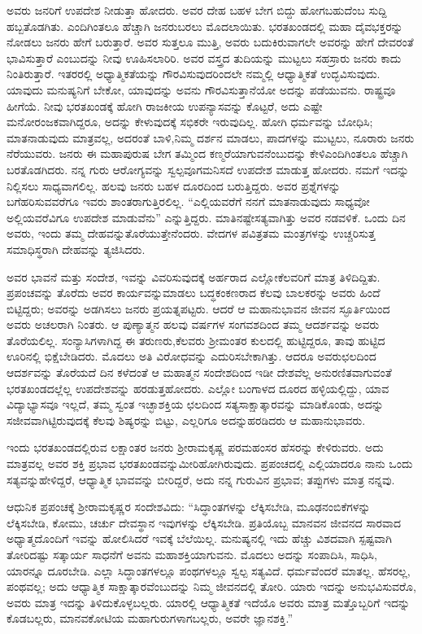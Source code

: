 ಅವರು ಜನರಿಗೆ ಉಪದೇಶ ನೀಡುತ್ತಾ ಹೋದರು. ಅವರ ದೇಹ ಬಹಳ ಬೇಗ ಬಿದ್ದು ಹೋಗಬಹುದೆಂಬ ಸುದ್ದಿ ಹಬ್ಬತೊಡಗಿತು. ಎಂದಿಗಿಂತಲೂ ಹೆಚ್ಚಾಗಿ ಜನರು\break ಬರಲು ಮೊದಲಾಯಿತು. ಭರತಖಂಡದಲ್ಲಿ ಮಹಾ ದೈವಭಕ್ತರನ್ನು ನೋಡಲು ಜನರು ಹೇಗೆ ಬರುತ್ತಾರೆ. ಅವರ ಸುತ್ತಲೂ ಮುತ್ತಿ, ಅವರು ಬದುಕಿರುವಾಗಲೇ ಅವರನ್ನು ಹೇಗೆ ದೇವರಂತೆ ಭಾವಿಸುತ್ತಾರೆ ಎಂಬುದನ್ನು ನೀವು ಊಹಿಸಲಾರಿರಿ. ಅವರ ವಸ್ತ್ರದ ತುದಿಯನ್ನು ಮುಟ್ಟಲು ಸಹಸ್ರಾರು ಜನರು ಕಾದು ನಿಂತಿರುತ್ತಾರೆ. ಇತರರಲ್ಲಿ ಅಧ್ಯಾತ್ಮಿಕತೆಯನ್ನು ಗೌರವಿಸುವುದರಿಂದಲೇ ನಮ್ಮಲ್ಲಿ ಆಧ್ಯಾತ್ಮಿಕತೆ ಉದ್ಭವಿಸುವುದು. ಯಾವುದು ಮನುಷ್ಯನಿಗೆ ಬೇಕೋ, ಯಾವುದನ್ನು ಅವನು ಗೌರವಿಸುತ್ತಾನೆಯೋ ಅದನ್ನು ಪಡೆಯುವನು. ರಾಷ್ಟ್ರವೂ ಹೀಗೆಯೆ. ನೀವು ಭರತಖಂಡಕ್ಕೆ ಹೋಗಿ ರಾಜಕೀಯ ಉಪನ್ಯಾಸವನ್ನು ಕೊಟ್ಟರೆ, ಅದು ಎಷ್ಟೇ ಮನೋರಂಜಕವಾಗಿದ್ದರೂ, ಅದನ್ನು ಕೇಳುವುದಕ್ಕೆ ಸಭಿಕರೇ ಇರುವುದಿಲ್ಲ. ಹೋಗಿ ಧರ್ಮವನ್ನು ಬೋಧಿಸಿ; ಮಾತನಾಡುವುದು ಮಾತ್ರವಲ್ಲ, ಅದರಂತೆ ಬಾಳಿ,\break ನಿಮ್ಮ ದರ್ಶನ ಮಾಡಲು, ಪಾದಗಳನ್ನು ಮುಟ್ಟಲು, ನೂರಾರು ಜನರು ನೆರೆಯುವರು. ಜನರು ಈ ಮಹಾಪುರುಷ ಬೇಗ ತಮ್ಮಿಂದ ಕಣ್ಮರೆಯಾಗುವನೆಂಬುದನ್ನು ಕೇಳಿ\break ಎಂದಿಗಿಂತಲೂ ಹೆಚ್ಚಾಗಿ ಬರತೊಡಗಿದರು. ನನ್ನ ಗುರು ಆರೋಗ್ಯವನ್ನು ಸ್ವಲ್ಪವೂ\break ಗಮನಿಸದೆ ಉಪದೇಶ ಮಾಡುತ್ತ ಹೋದರು. ನಮಗೆ ಇದನ್ನು ನಿಲ್ಲಿಸಲು ಸಾಧ್ಯವಾಗಲಿಲ್ಲ. ಹಲವು ಜನರು ಬಹಳ ದೂರದಿಂದ ಬರುತ್ತಿದ್ದರು. ಅವರ ಪ್ರಶ್ನೆಗಳನ್ನು ಬಗೆಹರಿಸು\-ವವರೆಗೂ ಇವರು ಶಾಂತರಾಗುತ್ತಿರಲಿಲ್ಲ. “ಎಲ್ಲಿಯವರೆಗೆ ನನಗೆ ಮಾತನಾಡುವುದು ಸಾಧ್ಯವೋ ಅಲ್ಲಿಯವರೆವಿಗೂ ಉಪದೇಶ ಮಾಡುವೆನು” ಎನ್ನುತ್ತಿದ್ದರು. ಮಾತಿನಷ್ಟೇ\break ಸತ್ಯವಾಗಿತ್ತು ಅವರ ನಡವಳಿಕೆ. ಒಂದು ದಿನ ಅವರು, ಇಂದು ತಮ್ಮ ದೇಹವನ್ನು\break ತೊರೆಯುತ್ತೇನೆಂದರು. ವೇದಗಳ ಪವಿತ್ರತಮ ಮಂತ್ರಗಳನ್ನು ಉಚ್ಚರಿಸುತ್ತ ಸಮಾಧಿಸ್ಥರಾಗಿ ದೇಹವನ್ನು ತ್ಯಜಿಸಿದರು.

ಅವರ ಭಾವನೆ ಮತ್ತು ಸಂದೇಶ, ಇವನ್ನು ವಿವರಿಸುವುದಕ್ಕೆ ಅರ್ಹರಾದ ಎಲ್ಲೋ\break ಕೆಲವರಿಗೆ ಮಾತ್ರ ತಿಳಿದಿದ್ದಿತು. ಪ್ರಪಂಚವನ್ನು ತೊರೆದು ಅವರ ಕಾರ್ಯವನ್ನು\break ಮಾಡಲು ಬದ್ಧಕಂಕಣರಾದ ಕೆಲವು ಬಾಲಕರನ್ನು ಅವರು ಹಿಂದೆ ಬಿಟ್ಟಿದ್ದರು; ಅವರನ್ನು ಅಡಗಿಸಲು ಜನರು ಪ್ರಯತ್ನಪಟ್ಟರು. ಆದರೆ ಆ ಮಹಾನುಭಾವನ ಜೀವನ ಸ್ಫೂರ್ತಿಯಿಂದ ಅವರು ಅಚಲರಾಗಿ ನಿಂತರು. ಆ ಪುಣ್ಯಾತ್ಮನ ಹಲವು ವರ್ಷಗಳ ಸಂಗವಶದಿಂದ ತಮ್ಮ ಆದರ್ಶವನ್ನು ಅವರು ತೊರೆಯಲಿಲ್ಲ. ಸಂನ್ಯಾಸಿಗಳಾಗಿದ್ದ ಈ ತರುಣರು,\break ಕೆಲವರು ಶ‍್ರೀಮಂತರ ಕುಲದಲ್ಲಿ ಹುಟ್ಟಿದ್ದರೂ, ತಾವು ಹುಟ್ಟಿದ ಊರಿನಲ್ಲಿ ಭಿಕ್ಷೆ\break ಬೇಡಿದರು. ಮೊದಲು ಅತಿ ವಿರೋಧವನ್ನು ಎದುರಿಸಬೇಕಾಗಿತ್ತು. ಆದರೂ ಅವರು\break ಛಲದಿಂದ ಆದರ್ಶವನ್ನು ತೊರೆಯದೆ ದಿನ ಕಳೆದಂತೆ ಆ ಮಹಾತ್ಮನ ಸಂದೇಶದಿಂದ ಇಡೀ ದೇಶವೆಲ್ಲ ಅನುರಣಿತವಾಗುವಂತೆ ಭರತಖಂಡದಲ್ಲೆಲ್ಲ ಉಪದೇಶವನ್ನು ಹರಡುತ್ತ\break ಹೋದರು. ಎಲ್ಲೋ ಬಂಗಾಳದ ದೂರದ ಹಳ್ಳಿಯಲ್ಲಿದ್ದು, ಯಾವ ವಿದ್ಯಾಭ್ಯಾಸವೂ ಇಲ್ಲದೆ, ತಮ್ಮ ಸ್ವಂತ ಇಚ್ಛಾಶಕ್ತಿಯ ಛಲದಿಂದ ಸತ್ಯಸಾಕ್ಷಾತ್ಕಾರವನ್ನು ಮಾಡಿಕೊಂಡು, ಅದನ್ನು ಸಜೀವವಾಗಿಟ್ಟಿರುವುದಕ್ಕೆ ಕೆಲವು ಶಿಷ್ಯರನ್ನು ಬಿಟ್ಟು, ಎಲ್ಲರಿಗೂ ಅದನ್ನು\break ಹರಡಿದರು ಆ ಮಹಾನುಭಾವರು.

ಇಂದು ಭರತಖಂಡದಲ್ಲಿರುವ ಲಕ್ಷಾಂತರ ಜನರು ಶ‍್ರೀರಾಮಕೃಷ್ಣ ಪರಮಹಂಸರ ಹೆಸರನ್ನು ಕೇಳಿರುವರು. ಅದು ಮಾತ್ರವಲ್ಲ ಅವರ ಶಕ್ತಿ ಪ್ರಭಾವ ಭರತಖಂಡವನ್ನು\break ಮೀರಿಹೋಗಿರುವುದು. ಪ್ರಪಂಚದಲ್ಲಿ ಎಲ್ಲಿಯಾದರೂ ನಾನು ಒಂದು ಸತ್ಯವನ್ನು\break ಹೇಳಿದ್ದರೆ, ಆಧ್ಯಾತ್ಮಿಕ ಭಾವವನ್ನು ಬೀರಿದ್ದರೆ, ಅದು ನನ್ನ ಗುರುವಿನ ಪ್ರಭಾವ; ತಪ್ಪುಗಳು ಮಾತ್ರ ನನ್ನವು.

ಆಧುನಿಕ ಪ್ರಪಂಚಕ್ಕೆ ಶ‍್ರೀರಾಮಕೃಷ್ಣರ ಸಂದೇಶವಿದು: “ಸಿದ್ಧಾಂತಗಳನ್ನು ಲೆಕ್ಕಿಸಬೇಡಿ, ಮೂಢನಂಬಿಕೆಗಳನ್ನು ಲೆಕ್ಕಿಸಬೇಡಿ, ಕೋಮು, ಚರ್ಚು ದೇವಸ್ಥಾನ ಇವುಗಳನ್ನು ಲೆಕ್ಕಿಸಬೇಡಿ. ಪ್ರತಿಯೊಬ್ಬ ಮಾನವನ ಜೀವನದ ಸಾರವಾದ ಅಧ್ಯಾತ್ಮದೊಂದಿಗೆ ಇವನ್ನು ಹೋಲಿಸಿದರೆ ಇವಕ್ಕೆ ಬೆಲೆಯಿಲ್ಲ. ಮನುಷ್ಯನಲ್ಲಿ ಇದು ಹೆಚ್ಚು ವಿಶದವಾಗಿ ಸ್ಪಷ್ಟವಾಗಿ ತೋರಿದಷ್ಟು ಸತ್ಕಾರ್ಯ ಸಾಧನೆಗೆ ಅವನು ಮಹಾಶಕ್ತಿಯಾಗುವನು. ಮೊದಲು ಅದನ್ನು ಸಂಪಾದಿಸಿ, ಸಾಧಿಸಿ, ಯಾರನ್ನೂ ದೂರಬೇಡಿ. ಎಲ್ಲಾ ಸಿದ್ಧಾಂತಗಳಲ್ಲೂ ಪಂಥಗಳಲ್ಲೂ ಸ್ವಲ್ಪ ಸತ್ಯವಿದೆ. ಧರ್ಮವೆಂದರೆ ಮಾತಲ್ಲ. ಹೆಸರಲ್ಲ, ಪಂಥವಲ್ಲ; ಅದು ಆಧ್ಯಾತ್ಮಿಕ ಸಾಕ್ಷಾತ್ಕಾರವೆಂಬುದನ್ನು ನಿಮ್ಮ ಜೀವನದಲ್ಲಿ ತೋರಿ. ಯಾರು ಇದನ್ನು ಅನುಭವಿಸುವರೊ, ಅವರು ಮಾತ್ರ ಇದನ್ನು ತಿಳಿದುಕೊಳ್ಳಬಲ್ಲರು. ಯಾರಲ್ಲಿ ಆಧ್ಯಾತ್ಮಿಕತೆ ಇದೆಯೊ ಅವರು ಮಾತ್ರ ಮತ್ತೊಬ್ಬರಿಗೆ ಇದನ್ನು ಕೊಡಬಲ್ಲರು, ಮಾನವಕೋಟಿಯ ಮಹಾಗುರುಗಳಾಗಬಲ್ಲರು, ಅವರೇ ಜ್ಞಾನಶಕ್ತಿ.”


